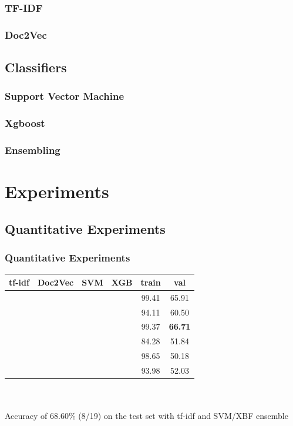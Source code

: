 \documentclass{beamer}
\newcommand{\cmark}{\ding{51}}%
\begin{document}
\begin{frame}
\frametitle{TF-IDF}

\end{frame}

\begin{frame}
\frametitle{Doc2Vec \cite{le2014distributed}}

\end{frame}

\subsection{Classifiers}

\begin{frame}
\frametitle{Support Vector Machine \cite{Cortes1995}}

\end{frame}

\begin{frame}
\frametitle{Xgboost \cite{chen2016xgboost}}

\end{frame}

\begin{frame}
\frametitle{Ensembling}

\end{frame}

\section{Experiments}

\subsection{Quantitative Experiments}

\begin{frame}
\frametitle{Quantitative Experiments}

\centering
\begin{tabular}{|c|c||c|c||c|c|}
\hline
tf-idf & Doc2Vec & SVM & XGB & train & val\\
\hline
\hline
\cmark & & \cmark & & 99.41 & 65.91 \\
\hline
\cmark & & & \cmark & 94.11 & 60.50 \\
\hline
\cmark & & \cmark & \cmark & 99.37 & \textbf{66.71} \\
\hline
\hline
& \cmark & \cmark & & 84.28 & 51.84 \\
\hline
& \cmark & & \cmark & 98.65 & 50.18 \\
\hline
& \cmark & \cmark & \cmark & 93.98 & 52.03 \\
\hline
\end{tabular}
\\~\\
Accuracy of 68.60\% (8/19) on the test set with tf-idf and SVM/XBF ensemble

\end{frame}
\end{document}
